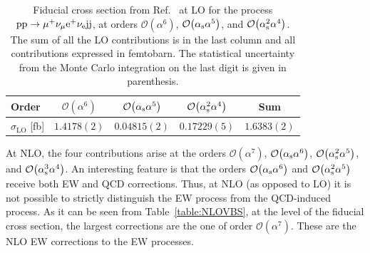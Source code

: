 \begin{table}
\begin{center}
\begin{tabular}{|l||c|c|c||c|}
\hline
Order & $\mathcal{O}{\left(\alpha^{6}\right)}$ & $\mathcal{O}{\left(\alpha_{\rm s}\alpha^{5}\right)}$ & $\mathcal{O}{\left(\alpha_{\rm s}^2\alpha^{4}\right)}$ & Sum \\
\hline
\hline
${\sigma_{\mathrm{LO}}}$ [fb] 
& $1.4178(2)$
& $0.04815(2)$
& $0.17229(5)$
& $1.6383(2)$ \\
\hline
\end{tabular}
\end{center}
\caption{
Fiducial cross section from Ref.~\cite{Biedermann:2017bss} at LO for the process ${\rm p}{\rm p}\to\mu^+\nu_\mu{\rm e}^+\nu_{\rm e}{\rm j}{\rm j}$, at
orders  $\mathcal{O}{\left(\alpha^{6}\right)}$, $\mathcal{O}{\left(\alpha_{\rm s}\alpha^{5}\right)}$, and $\mathcal{O}{\left(\alpha_{\rm s}^2\alpha^{4}\right)}$.
The sum of all the LO contributions is in the last column and all contributions expressed in femtobarn. 
The statistical uncertainty from the Monte Carlo integration on the last digit is given in parenthesis.}
\label{table:LOVBS}
\end{table}

At NLO, the four contributions arise at the orders $\mathcal{O}{\left(\alpha^{7}\right)}$, $\mathcal{O}{\left(\alpha_{\rm s}\alpha^{6}\right)}$, $\mathcal{O}{\left(\alpha_{\rm s}^{2}\alpha^{5}\right)}$, and $\mathcal{O}{\left(\alpha_{\rm s}^{3}\alpha^{4}\right)}$. 
An interesting feature is that the orders $\mathcal{O}{\left(\alpha_{\rm s}\alpha^{6}\right)}$ and $\mathcal{O}{\left(\alpha_{\rm s}^{2}\alpha^{5}\right)}$ receive both EW and QCD corrections.
Thus, at NLO (as opposed to LO) it is not possible to strictly distinguish the EW process from the QCD-induced process.
As it can be seen from Table~\ref{table:NLOVBS}, at the level of the fiducial cross section, the largest corrections are the one of order $\mathcal{O}{\left(\alpha^{7}\right)}$.
These are the NLO EW corrections to the EW processes.

